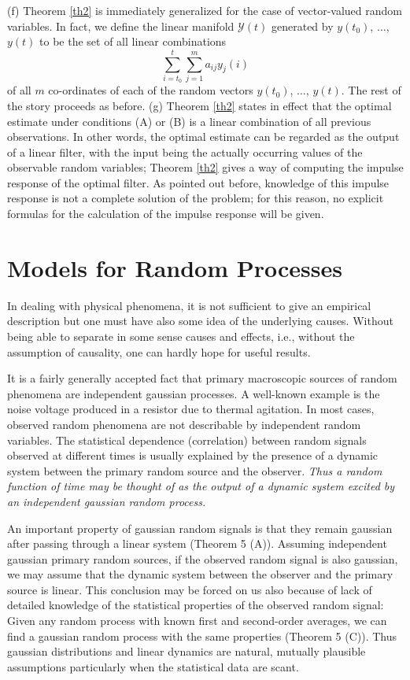 \documentclass{article}
\newcommand{\manf}[1]{\mathbf{\mathcal{#1}}}
\begin{document}
(f) Theorem \ref{th2} is immediately generalized for the case of vector-valued random variables. In fact, we define the linear manifold $\manf{Y}(t)$ generated by $y(t_0)$, $\dotsc$, $y(t)$ to be the set of all linear combinations
\begin{equation*}
\sum^t_{i=t_0}\sum^m_{j=1}a_{ij}y_j (i)
\end{equation*}
of all $m$ co-ordinates of each of the random vectors $y(t_0)$, $\dotsc$, $y(t)$. The rest of the story proceeds as before.
(g) Theorem \ref{th2} states in effect that the optimal estimate under conditions (A) or (B) is a linear combination of all previous observations. In other words, the optimal estimate can be regarded as the output of a linear filter, with the input being the actually occurring values of the observable random variables; Theorem \ref{th2} gives a way of computing the impulse response of the optimal filter. As pointed out before, knowledge of this impulse response is not a complete solution of the problem; for this reason, no explicit formulas for the calculation of the impulse response will be given.

\section{Models for Random Processes}
In dealing with physical phenomena, it is not sufficient to give an empirical description but one must have also some idea of the underlying causes. Without being able to separate in some sense causes and effects, i.e., without the assumption of causality, one can hardly hope for useful results.

It is a fairly generally accepted fact that primary macroscopic sources of random phenomena are independent gaussian processes. A well-known example is the noise voltage produced in a resistor due to thermal agitation. In most cases, observed random phenomena are not describable by independent random variables. The statistical dependence (correlation) between random signals observed at different times is usually explained by the presence of a dynamic system between the primary random source and the observer. \emph{Thus a random function of time may be thought of as the
output of a dynamic system excited by an independent gaussian random process.}

An important property of gaussian random signals is that they remain gaussian after passing through a linear system (Theorem 5 (A)). Assuming independent gaussian primary random sources, if the observed random signal is also gaussian, we may assume that the dynamic system between the observer and the primary source is linear. This conclusion may be forced on us also because of lack of detailed knowledge of the statistical properties of the observed random signal: Given any random process with known first and second-order averages, we can find a gaussian random process with the same properties (Theorem 5 (C)). Thus gaussian distributions and linear dynamics are natural, mutually plausible assumptions particularly when the statistical data are scant.
\end{document}
